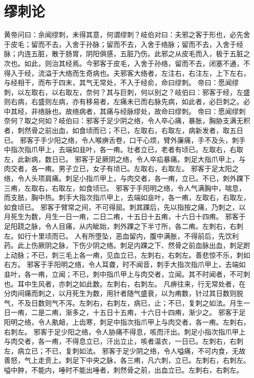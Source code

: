 \documentclass[a4paper,12pt,UTF8,twoside]{ctexbook}
\begin{document}
\chapter{缪刺论}
黄帝问曰：余闻缪刺，未得其意，何谓缪刺？岐伯对曰：夫邪之客于形也，必先舍于皮毛；留而不去，入舍于孙脉；留而不去，入舍于络脉；留而不去，入舍于经脉；内连五脏，散于肠胃，阴阳俱感，五脏乃伤。此邪之从皮毛而入，极于五脏之次也。如此，则治其经焉。今邪客于皮毛，入舍于孙络，留而不去，闭塞不通，不得入于经，流溢于大络而生奇病也。夫邪客大络者，左注右，右注左，上下左右，与经相干，而布于四末，其气无常处，不入于经俞，命曰缪刺。
帝曰：愿闻缪刺，以左取右，以右取左，奈何？其与巨刺，何以别之？岐伯曰：邪客于经，左盛则右病，右盛则左病，亦有移易者，左痛未已而右脉先病，如此者，必巨刺之。必中其经，非络脉也。故络病者，其痛与经脉缪处，故命曰缪刺。
帝曰：愿闻缪刺奈何？取之何如？岐伯曰：邪客于足少阴之络，令人卒心痛，暴胀，胸胁支满无积者，刺然骨之前出血，如食顷而已；不已，左取右，右取左，病新发者，取五日已。
邪客于手少阳之络，令人喉痹舌卷，口干心烦，臂外廉痛，手不及头，刺手中指次指爪甲上，去端如韭叶，各一痏。壮者立已，老者有顷已。左取右，右取左，此新病，数日已。
邪客于足厥阴之络，令人卒疝暴痛。刺足大指爪甲上，与肉交者，各一痏。男子立已，女子有顷已。左取右，右取左。
邪客于足太阳之络，令人头项肩痛。刺足小指爪甲上，与肉交者，各一痏，立已。不已，刺外踝下三痏，左取右，右取左，如食顷已。
邪客于手阳明之络，令人气满胸中，喘息，而支胠，胸中热。刺手大指次指爪甲上，去端如韭叶，各一痏，左取右，右取左，如食顷已。
邪客于臂常之间，不可得屈。刺其踝后，先以指按之痛，乃刺之，以月死生为数，月生一日一痏，二日二痏，十五日十五痏，十六日十四痏。
邪客于足阳跷之脉，令人目痛，从内眦始，刺外踝之下半寸所，各二痏。左刺右，右刺左。如行十里顷而已。
人有所堕坠，恶血留内，腹中满胀，不得前后，先饮利药。此上伤厥阴之脉，下伤少阴之络。刺足内踝之下、然骨之前血脉出血，刺足跗上动脉；不已，刺三毛上各一痏，见血立已，左刺右，右刺左。善悲惊不乐，刺如右方。
邪客于手阳明之络，令人耳聋，时不闻音，刺手大指次指爪甲上，去端如韭叶，各一痏，立闻；不已，刺中指爪甲上与肉交者，立闻。其不时闻者，不可刺也。耳中生风者，亦刺之如此数。左刺右，右刺左。
凡痹往来，行无常处者，在分肉间痛而刺之，以月死生为数，用针者随气盛衰，以为痏数，针过其日数则脱气，不及日数则气不泻。左刺右，右刺左，病已，止；不已，复刺之如法。月生一日一痏，二是二痏，渐多之，十五日十五痏，十六日十四痏，渐少之。
邪客于足阳明之络，令人鼽衄，上齿寒，刺足中指次指爪甲上与肉交者，各一痏。左刺右，右刺左。
邪客于足少阳之络，令人胁痛不得息，咳而汗出。刺足小指次指爪甲上与肉交者，各一痏，不得息立已，汗出立止，咳者温衣，一日已。左刺右，右刺左，病立已；不已，复刺如法。
邪客于足少阴之络，令人嗌痛，不可内食，无故善怒，气上走贲上。刺足下中央之脉，各三痏，凡六刺，立已。左刺右，右刺左。嗌中肿，不能内，唾时不能出唾者，刺然骨之前，出血立已。左刺右，右刺左。
\end{document}
